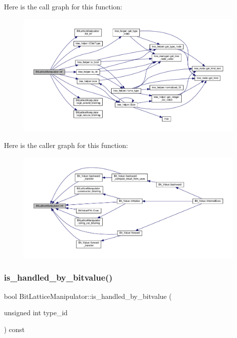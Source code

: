 Here is the call graph for this function\+:
\nopagebreak
\begin{figure}[H]
\begin{center}
\leavevmode
\includegraphics[width=350pt]{dd/d98/classBitLatticeManipulator_ae7c7d4aab6d19114196a9dc8cea6a32c_cgraph}
\end{center}
\end{figure}
Here is the caller graph for this function\+:
\nopagebreak
\begin{figure}[H]
\begin{center}
\leavevmode
\includegraphics[width=350pt]{dd/d98/classBitLatticeManipulator_ae7c7d4aab6d19114196a9dc8cea6a32c_icgraph}
\end{center}
\end{figure}
\mbox{\label{classBitLatticeManipulator_ad148175c9bd6d44c0e75a6af94deedc8}} 
\subsubsection{\texorpdfstring{is\+\_\+handled\+\_\+by\+\_\+bitvalue()}{is\_handled\_by\_bitvalue()}}
{\footnotesize\ttfamily bool Bit\+Lattice\+Manipulator\+::is\+\_\+handled\+\_\+by\+\_\+bitvalue (\begin{DoxyParamCaption}\item[{unsigned int}]{type\+\_\+id }\end{DoxyParamCaption}) const\hspace{0.3cm}{\ttfamily [protected]}}



